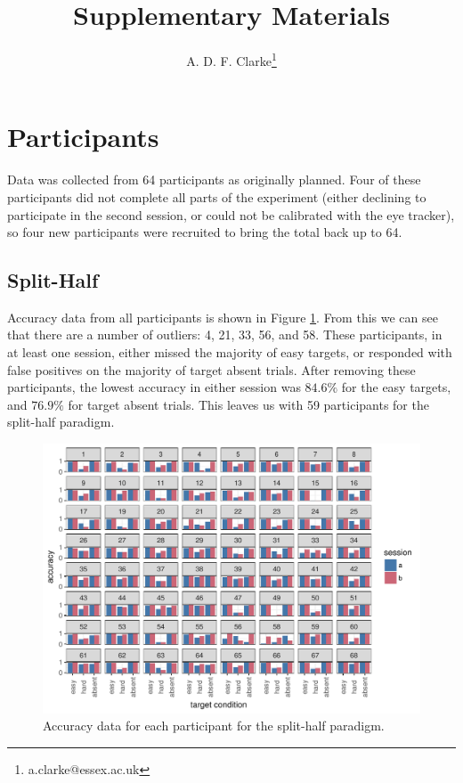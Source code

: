 \documentclass[a4paper, oneside, 11pt, onecolumn]{article}
\begin{document}
\title{Supplementary Materials}

\author{A. D. F. Clarke\thanks{a.clarke@essex.ac.uk}}



\maketitle

\begin{abstract}

\end{abstract}

\section{Participants}

Data was collected from 64 participants as originally planned. Four of these participants did not complete all parts of the experiment (either declining to participate in the second session, or could not be calibrated with the eye tracker), so four new participants were recruited to bring the total back up to 64. 

\subsection{Split-Half}

Accuracy data from all participants is shown in Figure \ref{fig:splithalf_acc_all}. From this we can see that there are a number of outliers: 4, 21, 33, 56, and 58. These participants, in at least one session, either missed the majority of easy targets, or responded with false positives on the majority of target absent trials. After removing these participants, the lowest accuracy in either session was $84.6\%$ for the easy targets, and $76.9\%$ for target absent trials. This leaves us with 59 participants for the split-half paradigm. 

\begin{figure}
\centering
\includegraphics[width=14cm]{../Scripts/lineseg/scratch/acc_by_session_by_person.pdf}
\caption{Accuracy data for each participant for the split-half paradigm.}
\label{fig:splithalf_acc_all}
\end{figure}
\end{document}
